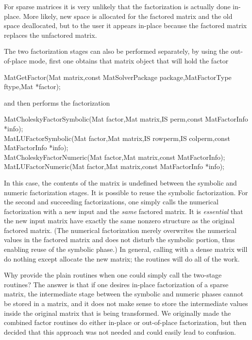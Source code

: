 {{For sparse matrices it is very unlikely that the factorization
is actually done in-place. More likely, new space is allocated
for the factored matrix and the old space deallocated, but to the
user it appears in-place because the factored matrix replaces
the unfactored matrix.

The 
two
factorization
stages
can also be performed separately, by using the out-of-place mode, first
one obtains that matrix object that will hold the factor
\begin{tabbing}
  MatGetFactor(Mat matrix,const MatSolverPackage package,MatFactorType ftype,Mat *factor);
\end{tabbing}
and then performs the factorization
\begin{tabbing}
  MatCholeskyFactorSymbolic(Mat factor,Mat matrix,IS perm,const MatFactorInfo *info);\\
  MatLUFactorSymbolic(Mat factor,Mat matrix,IS rowperm,IS colperm,const MatFactorInfo *info);\\
  MatCholeskyFactorNumeric(Mat factor,Mat matrix,const MatFactorInfo);\\
  MatLUFactorNumeric(Mat factor,Mat matrix,const MatFactorInfo *info);
\end{tabbing}
In this case, the contents of the matrix  is undefined between
the symbolic and numeric factorization stages.
It is possible to reuse the symbolic factorization. For the second and
succeeding factorizations, one simply calls the numerical factorization with a
new input  and the {\em same} factored  matrix.
It is {\em essential} that the new input matrix
have   %
exactly the same nonzero structure as the original factored matrix.
(The numerical factorization merely overwrites the numerical values in the
factored matrix and does not disturb the symbolic portion, thus enabling
reuse of the symbolic phase.)
In general, calling  with a dense matrix will
do nothing except allocate the new matrix; the 
routines will do all of the work.

Why provide the plain  routines when one could simply
call the two-stage routines? The answer is that if one desires in-place
factorization of a sparse matrix, the intermediate stage between the
symbolic and numeric phases cannot be stored in a  matrix, and
it does not make sense to store the intermediate values
inside the original matrix
that is being transformed.  We originally made the combined factor routines
do either in-place or out-of-place factorization, but then decided that
this approach was not needed and could easily lead to confusion.

}}
